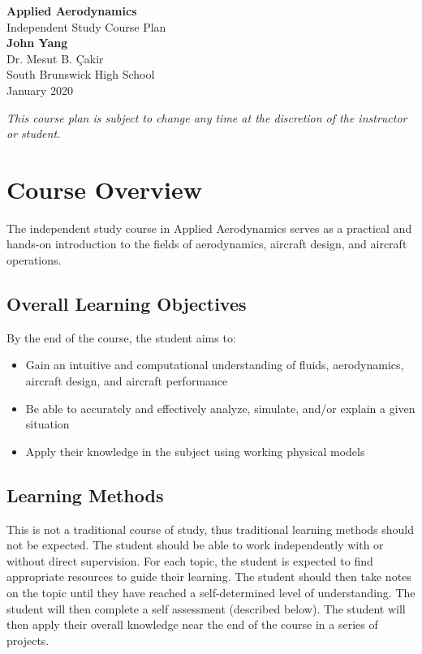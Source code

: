 \documentclass[12pt]{article}
\begin{document}
	\begin{titlepage}
		\begin{center}
			\vspace*{1cm}
			\Huge
				\textbf{Applied Aerodynamics}\\
			\vspace{0.5cm}
			\LARGE
				Independent Study Course Plan\\
			\vspace{1.5cm}
				\textbf{John Yang}\\
			\vfill
			\vspace{0.8cm}
			\Large
				Dr. Mesut B. \c{C}akir\\
				South Brunswick High School\\
				January 2020
		\end{center}
	\end{titlepage}

\tableofcontents\newpage

\textit{This course plan is subject to change any time at the discretion of the instructor or student.}

\section{Course Overview}
The independent study course in Applied Aerodynamics serves as a practical and hands-on introduction to the fields of aerodynamics, aircraft design, and aircraft operations.
	\subsection{Overall Learning Objectives}
		By the end of the course, the student aims to: 
			\begin{itemize}
				\item Gain an intuitive and computational understanding of fluids, aerodynamics, aircraft design, and aircraft performance
				\item Be able to accurately and effectively analyze, simulate, and/or explain a given situation
				\item Apply their knowledge in the subject using working physical models
			\end{itemize}
	\subsection{Learning Methods}
		This is not a traditional course of study, thus traditional learning methods should not be expected. The student should be able to work independently with or without direct supervision. For each topic, the student is expected to find appropriate resources to guide their learning. The student should then take notes on the topic until they have reached a self-determined level of understanding. The student will then complete a self assessment (described below). The student will then apply their overall knowledge near the end of the course in a series of projects.  
\end{document}
